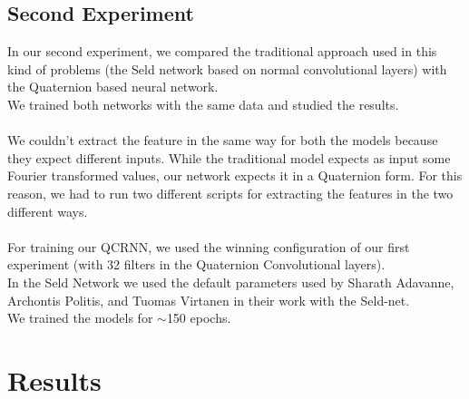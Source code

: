 \documentclass{article}
\begin{document}
    \subsection*{Second Experiment}
    In our second experiment, we compared the traditional approach used in this kind of problems (the Seld network based on normal convolutional layers) with the Quaternion based neural network.\\
    We trained both networks with the same data and studied the results.
    \\ \\ We couldn't extract the feature in the same way for both the models because they expect different inputs. While the traditional model expects as input some Fourier transformed values, our network expects it in a Quaternion form. For this reason, we had to run two different scripts for extracting the features in the two different ways. 
	\\ \\ For training our QCRNN, we used the winning configuration of our first experiment (with 32 filters in the Quaternion Convolutional layers).
	\\In the Seld Network we used the default parameters used by Sharath Adavanne, Archontis Politis, and Tuomas Virtanen in their work with the Seld-net. 
	\\ We trained the models for $\sim$150 epochs.
    \section{Results}
\end{document}

